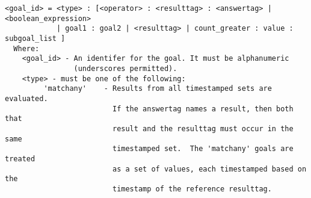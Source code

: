 \documentclass[12pt]{article}
\begin{document}
\begin{verbatim}
<goal_id> = <type> : [<operator> : <resulttag> : <answertag> | <boolean_expression> 
            | goal1 : goal2 | <resulttag> | count_greater : value : subgoal_list ]
  Where: 
    <goal_id> - An identifer for the goal. It must be alphanumeric 
                (underscores permitted).
    <type> - must be one of the following:
         'matchany'    - Results from all timestamped sets are evaluated.
                         If the answertag names a result, then both that 
                         result and the resulttag must occur in the same 
                         timestamped set.  The 'matchany' goals are treated 
                         as a set of values, each timestamped based on the 
                         timestamp of the reference resulttag.
                      

\end{verbatim}
\end{document}
